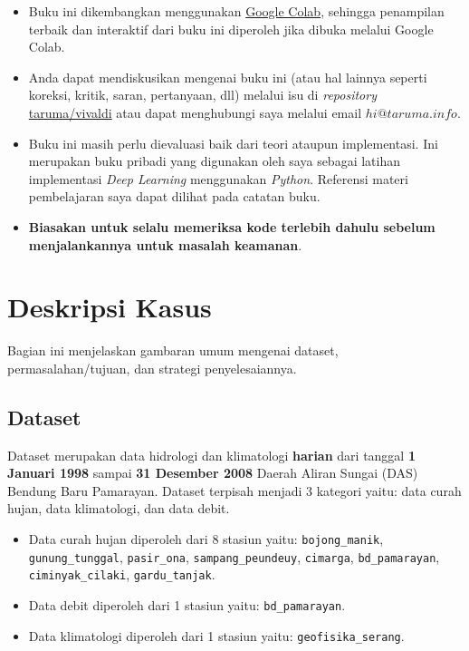 \documentclass[11pt]{article}
\providecommand{\tightlist}{%
      \setlength{\itemsep}{0pt}\setlength{\parskip}{0pt}}
\begin{document}
\begin{itemize}
\tightlist
\item
  Buku ini dikembangkan menggunakan
  \href{https://colab.research.google.com/}{Google Colab}, sehingga
  penampilan terbaik dan interaktif dari buku ini diperoleh jika dibuka
  melalui Google Colab.
\item
  Anda dapat mendiskusikan mengenai buku ini (atau hal lainnya seperti
  koreksi, kritik, saran, pertanyaan, dll) melalui isu di
  \emph{repository}
  \href{https://github.com/taruma/vivaldi}{taruma/vivaldi} atau dapat
  menghubungi saya melalui email \(hi@taruma.info\).
\item
  Buku ini masih perlu dievaluasi baik dari teori ataupun implementasi.
  Ini merupakan buku pribadi yang digunakan oleh saya sebagai latihan
  implementasi \emph{Deep Learning} menggunakan \emph{Python}. Referensi
  materi pembelajaran saya dapat dilihat pada catatan buku.
\item
  \textbf{Biasakan untuk selalu memeriksa kode terlebih dahulu sebelum
  menjalankannya untuk masalah keamanan}.
\end{itemize}

    \hypertarget{deskripsi-kasus}{%
\section{Deskripsi Kasus}\label{deskripsi-kasus}}

Bagian ini menjelaskan gambaran umum mengenai dataset,
permasalahan/tujuan, dan strategi penyelesaiannya.

    \hypertarget{dataset}{%
\subsection{Dataset}\label{dataset}}

Dataset merupakan data hidrologi dan klimatologi \textbf{harian} dari
tanggal \textbf{1 Januari 1998} sampai \textbf{31 Desember 2008} Daerah
Aliran Sungai (DAS) Bendung Baru Pamarayan. Dataset terpisah menjadi 3
kategori yaitu: data curah hujan, data klimatologi, dan data debit.

\begin{itemize}
\tightlist
\item
  Data curah hujan diperoleh dari 8 stasiun yaitu:
  \texttt{bojong\_manik}, \texttt{gunung\_tunggal}, \texttt{pasir\_ona},
  \texttt{sampang\_peundeuy}, \texttt{cimarga}, \texttt{bd\_pamarayan},
  \texttt{ciminyak\_cilaki}, \texttt{gardu\_tanjak}.
\item
  Data debit diperoleh dari 1 stasiun yaitu: \texttt{bd\_pamarayan}.
\item
  Data klimatologi diperoleh dari 1 stasiun yaitu:
  \texttt{geofisika\_serang}.
\end{itemize}
\end{document}
